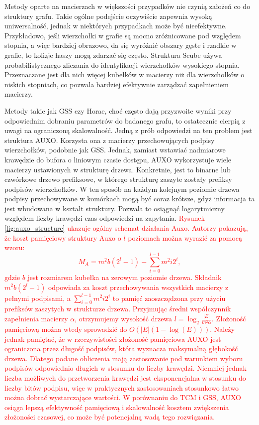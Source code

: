     Metody oparte na macierzach w większości przypadków nie czynią założeń co do struktury grafu. Takie ogólne podejście oczywiście zapewnia wysoką uniwersalność, jednak w niektórych przypadkach może być nieefektywne. Przykładowo, jeśli wierzchołki w grafie są mocno zróżnicowane pod względem stopnia, a więc bardziej obrazowo, da się wyróżnić obszary gęste i rzadkie w grafie, to kolizje haszy mogą zdarzać się często. Struktura Scube\cite{Chen_Zhou_Chen_Jin_2022} używa probabilistycznego zliczania do identyfikacji wierzchołków wysokiego stopnia. Przeznaczane jest dla nich więcej kubełków w macierzy niż dla wierzchołków o niskich stopniach, co pozwala bardziej efektywnie zarządzać zapełnieniem macierzy. 

    Metody takie jak GSS czy Horae, choć często dają przyzwoite wyniki przy odpowiednim dobraniu parametrów do badanego grafu, to ostatecznie cierpią z uwagi na ograniczoną skalowalność. Jedną z prób odpowiedzi na ten problem jest struktura AUXO\cite{Jiang_Chen_Jin_2023}. Korzysta ona z macierzy przechowujących podpisy wierzchołków, podobnie jak GSS. Jednak, zamiast wstawiać nadmiarowe krawędzie do bufora o liniowym czasie dostępu, AUXO wykorzystuje wiele macierzy ustawionych w strukturę drzewa. Konkretnie, jest to binarne lub czwórkowe drzewo prefiksowe, w którego strukturę zaszyte zostały prefiksy podpisów wierzchołków. W ten sposób na każdym kolejnym poziomie drzewa podpisy przechowywane w komórkach mogą być coraz krótsze, gdyż informacja ta jest wbudowana w kształt struktury. Pozwala to osiągnąć logarytmiczny względem liczby krawędzi czas odpowiedzi na zapytania. \textcolor{red}{Rysunek \ref{fig:auxo_structure} ukazuje ogólny schemat działania Auxo. Autorzy pokazują, że koszt pamięciowy struktury Auxo o $l$ poziomach można wyrazić za pomocą wzoru:
    \[
        M_A = m^2b(2^l - 1) - \sum\limits_{i = 0}^{l - 1} m^2 i 2^i,
    \]
    gdzie $b$ jest rozmiarem kubełka na zerowym poziomie drzewa. Składnik $m^2b(2^l - 1)$ odpowiada za koszt przechowywania wszystkich macierzy z pełnymi podpisami, a $\sum\limits_{i = 0}^{l - 1} m^2 i 2^i$ to pamięć zaoszczędzona przy użyciu prefiksów zaszytych  w strukturze drzewa. Przyjmując średni współczynnik zapełnienia macierzy $\alpha$, otrzymujemy wysokość drzewa $l = \log_{2} \frac{\vert E \vert}{m^2 \alpha}$. Złożoność pamięciową można wtedy sprowadzić do $O(|E|(1 - \log(E)))$. Należy jednak pamiętać, że w rzeczywistości złożoność pamięciowa AUXO jest ograniczona przez długość podpisów, która wyznacza maksymalną głębokość drzewa. Dlatego podane obliczenia mają zastosowanie pod warunkiem wyboru podpisów odpowiednio długich w stosunku do liczby krawędzi. Niemniej jednak liczba możliwych do przetworzenia krawędzi jest eksponencjalna w stosunku do liczby bitów podpisu, więc w praktycznych zastosowaniach stosunkowo łatwo można dobrać wystarczające wartości. W porównaniu do TCM i GSS, AUXO osiąga lepszą efektywność pamięciową i skalowalność kosztem zwiększenia złożoności czasowej, co może być potencjalną wadą tego rozwiązania.}

